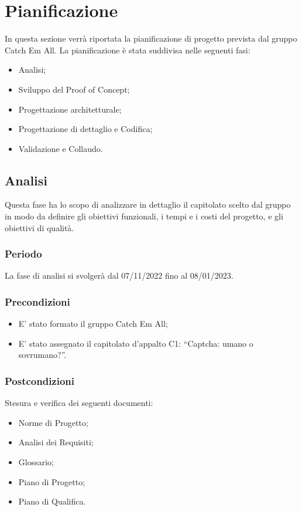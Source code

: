 \section{Pianificazione}
In questa sezione verrà riportata la pianificazione di progetto prevista dal gruppo Catch Em
All. La pianificazione è stata suddivisa nelle seguenti fasi:
\begin{itemize}
	\item Analisi;
	\item Sviluppo del Proof of Concept;
	\item Progettazione architetturale;
    \item Progettazione di dettaglio e Codifica;
	\item Validazione e Collaudo.
\end{itemize}

\subsection{Analisi}
Questa fase ha lo scopo di analizzare in dettaglio il capitolato scelto dal gruppo in modo da definire gli obiettivi funzionali, i tempi e i costi del progetto, e gli obiettivi di qualità.

\subsubsection{Periodo}
La fase di analisi si svolgerà dal 07/11/2022 fino al 08/01/2023.

\subsubsection{Precondizioni}
\begin{itemize}
	\item E’ stato formato il gruppo Catch Em All;
	\item E’ stato assegnato il capitolato d’appalto C1: “Captcha: umano o sovrumano?”.
\end{itemize}

\subsubsection{Postcondizioni}
Stesura e verifica dei seguenti documenti:
\begin{itemize}
	\item Norme di Progetto;
	\item Analisi dei Requisiti;
	\item Glossario;
    \item Piano di Progetto;
	\item Piano di Qualifica.
\end{itemize}

